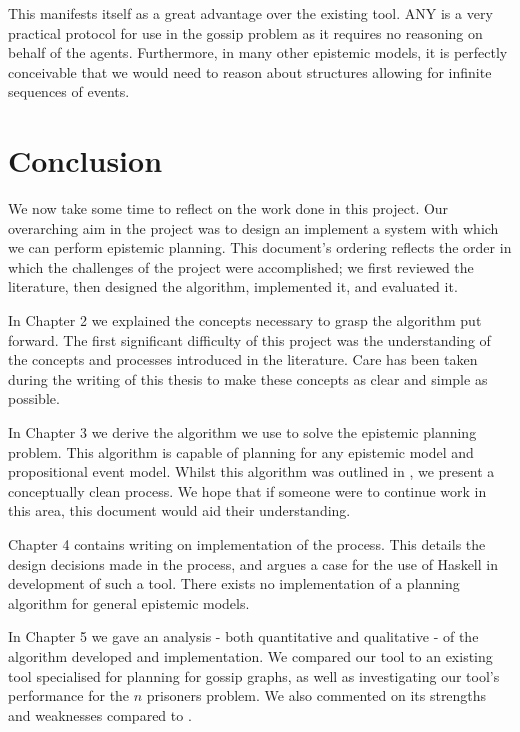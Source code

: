 \documentclass[10pt, a4paper]{report}
\begin{document}
This manifests itself as a great advantage over the existing tool. \textsf{ANY}
is a very practical protocol for use in the gossip problem as it requires no
reasoning on behalf of the agents. Furthermore, in many other epistemic models,
it is perfectly conceivable that we would need to reason about structures
allowing for infinite sequences of events. 

\newpage

\chapter{Conclusion}

We now take some time to reflect on the work done in this project. Our
overarching aim in the project was to design an implement a system with which we
can perform epistemic planning. This document's ordering reflects the order in
which the challenges of the project were accomplished; we first reviewed the
literature, then designed the algorithm, implemented it, and evaluated it. 

In Chapter 2 we explained the concepts necessary to grasp the algorithm put
forward. The first significant difficulty of this project was the understanding
of the concepts and processes introduced in the literature. Care has been taken
during the writing of this thesis to make these concepts as clear and simple as
possible. 

In Chapter 3 we derive the algorithm we use to solve the epistemic planning
problem. This algorithm is capable of planning for any epistemic model and
propositional event model. Whilst this algorithm was outlined in
\cite{AutomataTechniques}, we present a conceptually clean process. We hope that
if someone were to continue work in this area, this document would aid their
understanding.

Chapter 4 contains writing on implementation of the process. This details the
design decisions made in the process, and argues a case for the use of Haskell
in development of such a tool. There exists no implementation of a planning
algorithm for general epistemic models. 

In Chapter 5 we gave an analysis - both quantitative and qualitative - of the
algorithm developed and implementation. We compared our tool to an existing tool
specialised for planning for gossip graphs, as well as investigating our tool's
performance for the $n$ prisoners problem. We also commented on its strengths and
weaknesses compared to \cite{GithubGossip}.
\end{document}
